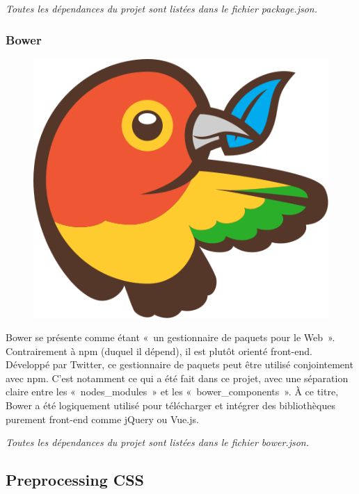 \documentclass[a4paper,12pt]{article}
\begin{document}
\textit{Toutes les dépendances du projet sont listées dans le fichier package.json.}

\subsubsection{Bower}

\begin{figure}[!h]
  \begin{center}
    \includegraphics[scale=0.2]{logo-bower.png}
  \end{center}
\end{figure}

Bower se présente comme étant «~un gestionnaire de paquets pour le Web~». Contrairement à npm (duquel il dépend), il est plutôt orienté front-end. Développé par Twitter, ce gestionnaire de paquets peut être utilisé conjointement avec npm. C'est notamment ce qui a été fait dans ce projet, avec une séparation claire entre les «~nodes\_modules~» et les «~bower\_components~». À ce titre, Bower a été logiquement utilisé pour télécharger et intégrer des bibliothèques purement front-end comme jQuery ou Vue.js.

\textit{Toutes les dépendances du projet sont listées dans le fichier bower.json.}

\subsection{Preprocessing CSS}
\end{document}
